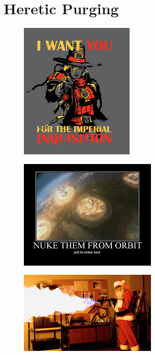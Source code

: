 \chapter{Heretic Purging}

\begin{figure}
	\begin{center}
		\includegraphics[width=\figwidth]{pics/6/1.png}
	\end{center}
\end{figure}

\begin{figure}
	\begin{center}
		\includegraphics[width=\figwidth]{pics/6/2.png}
	\end{center}
\end{figure}

\begin{figure}
	\begin{center}
		\includegraphics[width=\figwidth]{pics/6/3.png}
	\end{center}
\end{figure}

